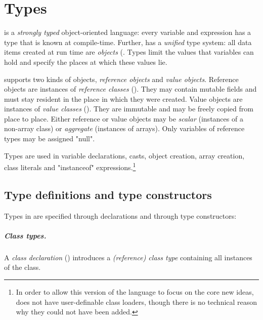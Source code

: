 \chapter{Types}
\label{XtenTypes}

{}\Xten{} is a {\em strongly typed} object-oriented language: every variable
and expression has a type that is known at compile-time. Further,
\Xten{} has a {\em unified} type system: all data items created at
run time are {\em objects} (. Types limit the
values that variables can hold and specify the places at which these
values lie.

{}\Xten{} supports two kinds of objects, {\em reference objects} and
{\em value objects}.  Reference objects are instances of {\em
reference classes} (). They may contain
mutable fields and must stay resident in the place in which they were
created. Value objects are instances of {\em value classes}
(). They are immutable and may be freely copied
from place to place. Either reference or value objects may be 
{\em scalar} (instances of a non-array class) or {\em aggregate} (instances
of arrays).
Only variables of reference types may be assigned \xcd"null".

Types are used in variable declarations, casts, object creation, array
creation, class literals and \xcd"instanceof" expressions.\footnote{In
order to allow this version of the language to focus on the core new
ideas, \XtenCurrVer{} does not have user-definable class loaders,
though there is no technical reason why they could not have been
added.}

\section{Type definitions and type constructors}

Types in \Xten{} are specified through declarations and through
type constructors:

\paragraph{Class types.}
\label{ReferenceTypes}


        A {\em class declaration} ()
        introduces a 
        {\em (reference) class type}
        containing all instances of the class.

